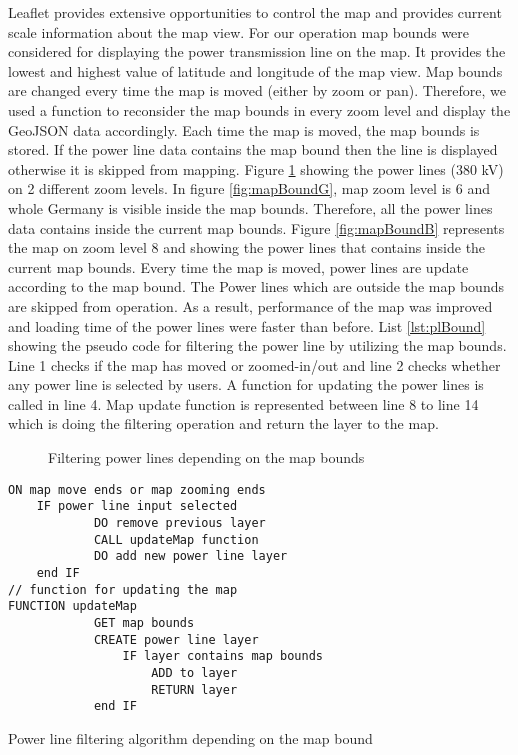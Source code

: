 Leaflet provides extensive opportunities to control the map and provides current scale information about the map view. For our operation map bounds were considered for displaying the power transmission line on the map. It provides the lowest and highest value of latitude and longitude of the map view. Map bounds are changed every time the map is moved (either by zoom or pan).  Therefore, we used a function to reconsider the map bounds in every zoom level and display the GeoJSON data accordingly. Each time the map is moved, the map bounds is stored. If the power line data contains the map bound then the line is displayed otherwise it is skipped from mapping. Figure \ref{fig:mpbound} showing the power lines (380 kV) on 2 different zoom levels. In figure \ref{fig:mapBoundG}, map zoom level is 6 and whole Germany is visible inside the map bounds. Therefore, all the power lines data contains inside the current map bounds. Figure \ref{fig:mapBoundB} represents the map on zoom level 8 and showing the power lines that contains inside the current map bounds. Every time the map is moved, power lines are update according to the map bound. The Power lines which are outside the map bounds are skipped from operation. As a result, performance of the map was improved and loading time of the power lines were faster than before. List \ref{lst:plBound} showing the pseudo code for filtering the power line by utilizing the map bounds. Line 1 checks if the map has moved or zoomed-in/out and line 2 checks whether any power line is selected by users. A function for updating the power lines is called in line 4. Map update function is represented between line 8 to line 14 which is doing the filtering operation and return the layer to the map. 

\begin{figure}
  \begin{center}
\hfill
{}
\hfill
\caption{Filtering power lines depending on the map bounds}
\label{fig:mpbound}
\end{center}
\end{figure}

\begin{Listing}
\begin{lstlisting}
ON map move ends or map zooming ends
	IF power line input selected
			DO remove previous layer
			CALL updateMap function
			DO add new power line layer
	end IF
// function for updating the map
FUNCTION updateMap
			GET map bounds
			CREATE power line layer
				IF layer contains map bounds
					ADD to layer
					RETURN layer
			end IF
\end{lstlisting}
\caption{Power line filtering algorithm depending on the map bound}
\label{lst:plBound}
\end{Listing}

